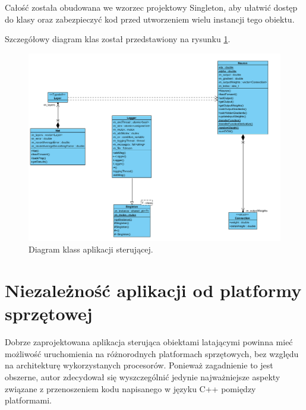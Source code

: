 \begin{itemize}
	Całość została obudowana we wzorzec projektowy Singleton, aby ułatwić dostęp do klasy oraz zabezpieczyć kod przed utworzeniem wielu instancji tego obiektu.
\end{itemize}

Szczegółowy diagram klas został przedstawiony na rysunku \ref{fig:diagram}.

\begin{figure}
\centering
\includegraphics[width=0.7\linewidth]{./include/diagram}
\caption{Diagram klass aplikacji sterującej.}
\label{fig:diagram}
\end{figure}

\section{Niezależność aplikacji od platformy sprzętowej}
Dobrze zaprojektowana aplikacja sterująca obiektami latającymi powinna mieć możliwość uruchomienia na różnorodnych platformach sprzętowych, bez względu na architekturę wykorzystanych procesorów. Ponieważ zagadnienie to jest obszerne, autor zdecydował się wyszczególnić jedynie najważniejsze aspekty związane z przenoszeniem kodu napisanego w języku C++ pomiędzy platformami. 

